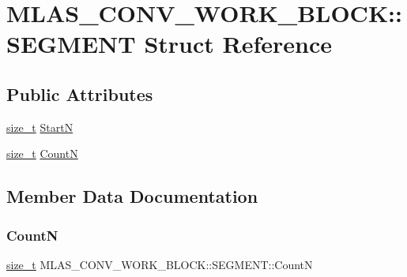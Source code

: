 \hypertarget{structMLAS__CONV__WORK__BLOCK_1_1SEGMENT}{}\section{M\+L\+A\+S\+\_\+\+C\+O\+N\+V\+\_\+\+W\+O\+R\+K\+\_\+\+B\+L\+O\+CK\+:\+:S\+E\+G\+M\+E\+NT Struct Reference}
\label{structMLAS__CONV__WORK__BLOCK_1_1SEGMENT}
\subsection*{Public Attributes}
\begin{DoxyCompactItemize}
\item 
\mbox{\hyperlink{mlasi_8h_a503efbc1c6e50825320ad909366b78ab}{size\+\_\+t}} \mbox{\hyperlink{structMLAS__CONV__WORK__BLOCK_1_1SEGMENT_a5352ff6569e8ee130214a700900ebc8d}{StartN}}
\item 
\mbox{\hyperlink{mlasi_8h_a503efbc1c6e50825320ad909366b78ab}{size\+\_\+t}} \mbox{\hyperlink{structMLAS__CONV__WORK__BLOCK_1_1SEGMENT_ae0e95989ce9d699db10fe08dd89b30bf}{CountN}}
\end{DoxyCompactItemize}


\subsection{Member Data Documentation}
\mbox{\label{structMLAS__CONV__WORK__BLOCK_1_1SEGMENT_ae0e95989ce9d699db10fe08dd89b30bf}} 
\subsubsection{\texorpdfstring{CountN}{CountN}}
{\footnotesize\ttfamily \mbox{\hyperlink{mlasi_8h_a503efbc1c6e50825320ad909366b78ab}{size\+\_\+t}} M\+L\+A\+S\+\_\+\+C\+O\+N\+V\+\_\+\+W\+O\+R\+K\+\_\+\+B\+L\+O\+C\+K\+::\+S\+E\+G\+M\+E\+N\+T\+::\+CountN}

